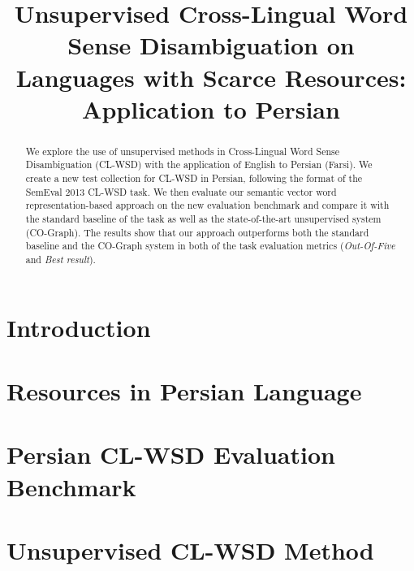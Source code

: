 \documentclass[11pt]{article}
\title{Unsupervised Cross-Lingual Word Sense Disambiguation on Languages with Scarce Resources: Application to Persian}
\author{}
\date{}
\begin{document}
\maketitle
\begin{abstract}
\vspace{-0.2cm}
We explore the use of unsupervised methods in Cross-Lingual Word Sense Disambiguation (CL-WSD) with the application of English to Persian (Farsi). We create a new test collection for CL-WSD in Persian, following the format of the SemEval 2013 CL-WSD task. We then evaluate our semantic vector word representation-based approach on the new evaluation benchmark and compare it with the standard baseline of the task as well as the state-of-the-art unsupervised system (CO-Graph). The results show that our approach outperforms both the standard baseline and the CO-Graph system in both of the task evaluation metrics (\emph{Out-Of-Five} and \emph{Best result}).
\vspace{-0.2cm}
\end{abstract}


\section{Introduction}
\vspace{-0.2cm}
\label{sec:introduction}

\vspace{-0.2cm}

\section{Resources in Persian Language}
\vspace{-0.2cm}
\label{sec:relatedwork}

\vspace{-0.2cm}

\section{Persian CL-WSD Evaluation Benchmark}
\vspace{-0.2cm}
\label{sec:persian_collection}

\vspace{-0.2cm}

\section{Unsupervised CL-WSD Method}
\vspace{-0.2cm}
\label{sec:methodology}

\vspace{-0.2cm}
\end{document}
